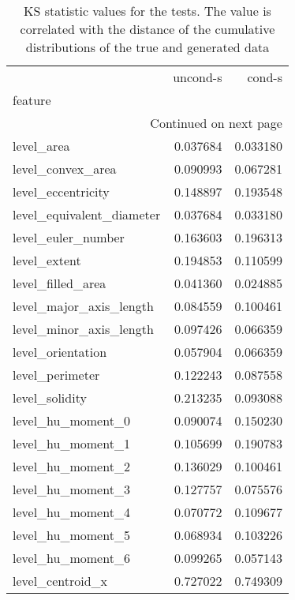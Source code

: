 \documentclass{report}
\begin{document}
\begin{longtable}{lrr}
	\caption[KS statistic values]{ \small KS statistic values for the tests. The value is correlated with the distance of the cumulative distributions of the true and generated data}\\
	\toprule
	{} &  uncond-s &    cond-s \\
	feature                       &           &           \\
	\midrule
	\endhead
	\midrule
	\multicolumn{3}{r}{{Continued on next page}} \\
	\midrule
	\endfoot
	
	\bottomrule
	\endlastfoot
	level\_area                    &  0.037684 &  0.033180 \\
	level\_convex\_area             &  0.090993 &  0.067281 \\
	level\_eccentricity            &  0.148897 &  0.193548 \\
	level\_equivalent\_diameter     &  0.037684 &  0.033180 \\
	level\_euler\_number            &  0.163603 &  0.196313 \\
	level\_extent                  &  0.194853 &  0.110599 \\
	level\_filled\_area             &  0.041360 &  0.024885 \\
	level\_major\_axis\_length       &  0.084559 &  0.100461 \\
	level\_minor\_axis\_length       &  0.097426 &  0.066359 \\
	level\_orientation             &  0.057904 &  0.066359 \\
	level\_perimeter               &  0.122243 &  0.087558 \\
	level\_solidity                &  0.213235 &  0.093088 \\
	level\_hu\_moment\_0             &  0.090074 &  0.150230 \\
	level\_hu\_moment\_1             &  0.105699 &  0.190783 \\
	level\_hu\_moment\_2             &  0.136029 &  0.100461 \\
	level\_hu\_moment\_3             &  0.127757 &  0.075576 \\
	level\_hu\_moment\_4             &  0.070772 &  0.109677 \\
	level\_hu\_moment\_5             &  0.068934 &  0.103226 \\
	level\_hu\_moment\_6             &  0.099265 &  0.057143 \\
	level\_centroid\_x              &  0.727022 &  0.749309 \\

\end{longtable}
\end{document}
